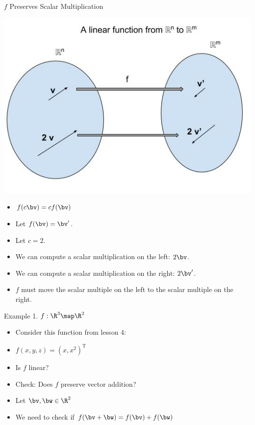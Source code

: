 \documentclass{beamer}
\begin{document}

\begin{frame}{$f$ Preserves Scalar Multiplication}

\begin{center}
\includegraphics[scale=0.25]{preserving-scalar-mult}
\end{center}

\begin{itemize}
\item $f(c \bv) = c f(\bv)$
\item Let $f(\bv) = \bv^{\prime}$.
\item Let $c = 2$.
\item We can compute a scalar multiplication on the left: $2 \bv$.
\item We can compute a scalar multiplication on the right: $2 \bv^{\prime}$.
\item $f$ must move the scalar multiple on the left to the scalar multiple on the right.
\end{itemize}

\end{frame}


\begin{frame}{Example 1. $f:\R^3\map\R^2$}

\begin{itemize}
\item Consider this function from lesson 4:
\item $f(x,y,z) = (x, x^2)^{\text{T}}$
\item Is $f$ linear?
\item Check: Does $f$ preserve vector addition?
\item Let $\bv, \bw \in \R^2$
\item We need to check if $f(\bv + \bw) = f(\bv) + f(\bw)$
\end{itemize}

\end{frame}
\end{document}
